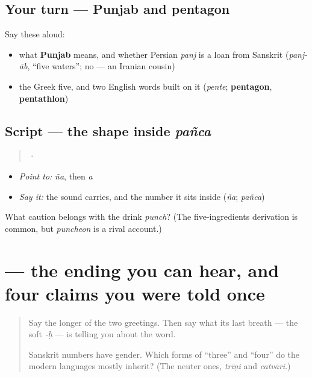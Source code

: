 \subsection*{Your turn — Punjab and pentagon}
Say these aloud:

\begin{itemize}
\raggedright
  \item what \textbf{Punjab} means, and whether Persian \emph{panj} is a loan from Sanskrit (\emph{panj-āb}, \textquotedblleft{}five waters\textquotedblright{}; no — an Iranian cousin)
  \item the Greek five, and two English words built on it (\emph{pente}; \textbf{pentagon}, \textbf{pentathlon})
\end{itemize}

\subsection*{Script — the shape inside \emph{pañca}}
\begin{quote}
 · 
\end{quote}

\begin{itemize}
\raggedright
  \item \emph{Point to:} \emph{ña}, then \emph{a}
  \item \emph{Say it:} the sound  carries, and the number it sits inside (\emph{ña}; \emph{pañca})
\end{itemize}

\begin{tcolorbox}[breakable,colback=teal!4,colframe=teal!35!black,title={Before you move on}]
What caution belongs with the drink \emph{punch}? (The five-ingredients derivation is common, but \emph{puncheon} is a rival account.)
\end{tcolorbox}
\section[\texorpdfstring{\sk{नमस्कारः} (namaskāraḥ)}{नमस्कारः (namaskāraḥ)}]{ — the ending you can hear, and four claims you were told once}

\label{lesson:SA-R06-second-pass-where-the-words-came-from}



\begin{quote}
Say the longer of the two greetings. Then say what its last breath — the soft \emph{-ḥ} — is telling you about the word.

Sanskrit numbers have gender. Which forms of \textquotedblleft{}three\textquotedblright{} and \textquotedblleft{}four\textquotedblright{} do the modern languages mostly inherit? (The neuter ones, \emph{trīṇi} and \emph{catvāri}.)
\end{quote}

